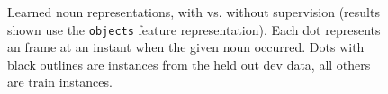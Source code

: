 \documentclass[11pt]{article}
\begin{document}
\begin{figure}[ht!]
\centering
{}%
%
%
\caption{Learned noun representations, with vs. without supervision (results shown use the \texttt{objects} feature representation). Each dot represents an frame at an instant when the given noun occurred. Dots with black outlines are instances from the held out dev data, all others are train instances.}
\label{fig:noun-clusters}
\end{figure}
\end{document}
